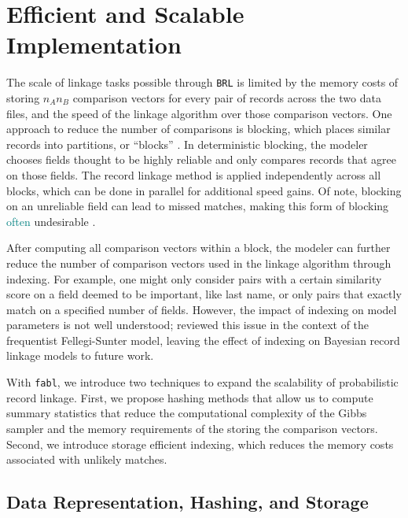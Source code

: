 \documentclass[ba]{imsart}
\begin{document}
\section{Efficient and Scalable Implementation}
\label{sec:efficiency}

The scale of linkage tasks possible through \texttt{BRL} is limited by the memory costs of storing $n_A  n_B$ comparison vectors for every pair of records across the two data files, and the speed of the linkage algorithm over those comparison vectors. One approach to reduce the number of comparisons is blocking, which places similar records into partitions, or ``blocks'' \citep{christen2019data}. In deterministic blocking, the modeler chooses fields thought to be highly reliable and only compares records that agree on those fields. The record linkage method is  applied independently across all blocks, which can be done in parallel for additional speed gains. Of note, blocking on an unreliable field can lead to missed matches, making this form of blocking \textcolor{teal}{often}
 undesirable %
\citep{steorts_comparison_2014}.

After computing all comparison vectors within a block, the modeler can further reduce the number of comparison vectors used in the linkage algorithm through indexing. For example, one might only consider pairs with a certain similarity score on a field deemed to be important, like last name, or only pairs that exactly match on a specified number of fields. However, the impact of indexing on model parameters is not well understood; \citep{murray2016probabilistic} reviewed this issue in the context of the frequentist Fellegi-Sunter model, leaving the effect of indexing on Bayesian record linkage models to future work.

With \texttt{fabl}, we introduce two techniques to expand the scalability of probabilistic record linkage. First, we propose hashing methods that allow us to compute summary statistics that reduce the computational complexity of the Gibbs sampler and the memory requirements of the storing the comparison vectors. Second, we introduce storage efficient indexing, which reduces the memory costs associated with unlikely matches. 


\hypertarget{data-representation-hashing-and-storage}{%
	\subsection{Data Representation, Hashing, and
		Storage}\label{data-representation-hashing-and-storage}}
	
\end{document}
